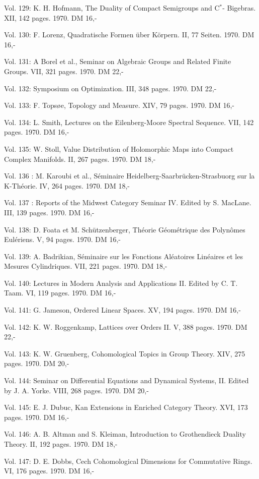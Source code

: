 Vol. 129: K. H. Hofmann, The Duality of Compact Semigroups and C$^*$- Bigebras. XII, 142 pages. 1970. DM 16,-

Vol. 130: F. Lorenz, Quadratische Formen über Körpern. II, 77 Seiten. 1970. DM 16,-

Vol. 131: A Borel et al., Seminar on Algebraic Groups and Related Finite Groups. VII, 321 pages. 1970. DM 22,-

Vol. 132: Symposium on Optimization. III, 348 pages. 1970. DM 22,-

Vol. 133: F. Topsøe, Topology and Measure. XIV, 79 pages. 1970. DM 16,-

Vol. 134: L. Smith, Lectures on the Eilenberg-Moore Spectral Sequence. VII, 142 pages. 1970. DM 16,-

Vol. 135: W. Stoll, Value Distribution of Holomorphic Maps into Compact Complex Manifolds. II, 267 pages. 1970. DM 18,-

Vol. 136 : M. Karoubi et al., Séminaire Heidelberg-Saarbrücken-Strasbuorg sur la K-Théorie. IV, 264 pages. 1970. DM 18,-

Vol. 137 : Reports of the Midwest Category Seminar IV. Edited by S. MacLane. III, 139 pages. 1970. DM 16,-

Vol. 138: D. Foata et M. Schützenberger, Théorie Géométrique des Polynômes Eulériens. V, 94 pages. 1970. DM 16,-

Vol. 139: A. Badrikian, Séminaire sur les Fonctions Aléatoires Linéaires et les Mesures Cylindriques. VII, 221 pages. 1970. DM 18,-

Vol. 140: Lectures in Modern Analysis and Applications II. Edited by C. T. Taam. VI, 119 pages. 1970. DM 16,-

Vol. 141: G. Jameson, Ordered Linear Spaces. XV, 194 pages. 1970. DM 16,-

Vol. 142: K. W. Roggenkamp, Lattices over Orders II. V, 388 pages. 1970. DM 22,-

Vol. 143: K. W. Gruenberg, Cohomological Topics in Group Theory. XIV, 275 pages. 1970. DM 20,-

Vol. 144: Seminar on Differential Equations and Dynamical Systems, II. Edited by J. A. Yorke. VIII, 268 pages. 1970. DM 20,-

Vol. 145: E. J. Dubuc, Kan Extensions in Enriched Category Theory. XVI, 173 pages. 1970. DM 16,-

Vol. 146: A. B. Altman and S. Kleiman, Introduction to Grothendieck Duality Theory. II, 192 pages. 1970. DM 18,-

Vol. 147: D. E. Dobbs, Cech Cohomological Dimensions for Commutative Rings. VI, 176 pages. 1970. DM 16,-

